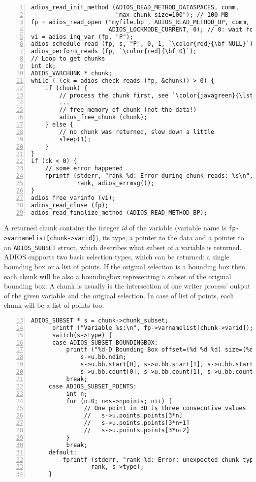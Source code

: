 \begin{lstlisting}[numbers=left, numberstyle=\color{gray}, stepnumber=2,
                             caption={Read variable with auto selection in chunks from a stream}, label=code:auto_read_chunks]
adios_read_init_method (ADIOS_READ_METHOD_DATASPACES, comm, 
                        "max_chunk_size=100"); // 100 MB 
fp = adios_read_open ("myfile.bp", ADIOS_READ_METHOD_BP, comm,
                      ADIOS_LOCKMODE_CURRENT, 0); // 0: wait forever
vi = adios_inq_var (fp, "P");
adios_schedule_read (fp, s, "P", 0, 1, `\color{red}{\bf NULL}`);
adios_perform_reads (fp, `\color{red}{\bf 0}`);   
// Loop to get chunks
int ck;
ADIOS_VARCHUNK * chunk;
while ( (ck = adios_check_reads (fp, &chunk)) > 0) {
    if (chunk) {
        // process the chunk first, see `\color{javagreen}{\lstlistingname~\ref{code:process_chunk}}`
        ... 
        // free memory of chunk (not the data!)
        adios_free_chunk (chunk);
    } else {
        // no chunk was returned, slow down a little
        sleep(1);
    }
}  
if (ck < 0) {
    // some error happened
    fprintf (stderr, "rank %d: Error during chunk reads: %s\n",
             rank, adios_errmsg());
}
adios_free_varinfo (vi); 
adios_read_close (fp);
adios_read_finalize_method (ADIOS_READ_METHOD_BP);
\end{lstlisting}

A returned chunk contains the integer \emph{id} of the variable (variable name is \verb+fp->varnamelist[chunk->varid]+), its type, a pointer to the data and a pointer to an \verb+ADIOS_SUBSET+ struct, which describes what subset of a variable is returned. ADIOS supports two basic selection types, which can be returned: a single bounding box or a list of points. If the original selection is a bounding box then each chunk will be also a boundingbox representing a subset of the original bounding box. A chunk is usually is the intersection of one writer process' output of the given variable and the original selection. In case of list of points, each chunk will be a list of points too. 

\begin{lstlisting}[numbers=left, numberstyle=\color{gray}, stepnumber=2,firstnumber=13,
                             caption={Processing chunks from a file}, label=code:process_chunk]
      ADIOS_SUBSET * s = chunk->chunk_subset;
      printf ("Variable %s:\n", fp->varnamelist[chunk->varid]);
      switch(s->type) {
      case ADIOS_SUBSET_BOUNDINGBOX:
          printf ("%d-D Bounding Box offset=(%d %d %d) size=(%d %d %d)\n",
              s->u.bb.ndim;
              s->u.bb.start[0], s->u.bb.start[1], s->u.bb.start[2],
              s->u.bb.count[0], s->u.bb.count[1], s->u.bb.count[2]);
          break;
     case ADIOS_SUBSET_POINTS:
          int n;
          for (n=0; n<s->npoints; n++) {
               // One point in 3D is three consecutive values
               //   s->u.points.points[3*n]
               //   s->u.points.points[3*n+1]
               //   s->u.points.points[3*n+2]
          }
          break;
     default:
         fprintf (stderr, "rank %d: Error: unexpected chunk type: %d\n",
                 rank, s->type);
     }  
 \end{lstlisting}



